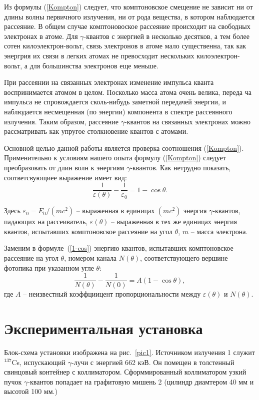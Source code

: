 \documentclass[a4paper,12pt]{article} %
\begin{document}
	Из формулы (\ref{Kompton}) следует, что комптоновское смещение не зависит ни от длины волны первичного излучения, ни от рода вещества, в котором наблюдается рассеяние. В общем случае комптоновоское рассеяние происходит на свободных электронах в атоме. Для $\gamma$-квантов с энергией в несколько десятков, а тем более сотен килоэлектрон-вольт, связь электронов в атоме мало существенна, так как энергрия их связи в легких атомах не превосходит нескольких килоэлектрон-вольт, а для большинства электронов еще меньше.
	
	При рассеянии на связанных электронах изменение импульса кванта воспринимается атомом в целом. Посколько масса атома очень велика, переда ча импульса не спровождается сколь-нибудь заметной передачей энергии, и наблюдается несмещенная (по энергии) компонента в спектре рассеянного излучения. Таким образом, рассеяние $\gamma$-квантов на связанных электронах можно рассматривать как упругое столкновение квантов с атомами.
	
	Основной целью данной работы является проверка соотношения (\ref{Kompton}). Применительно к условиям нашего опыта формулу (\ref{Kompton}) следует преобразовать от длин волн к энергиям $\gamma$-квантов. Как нетрудно показать, соответсвующиее выражение имеет вид:
	\begin{equation}
		\label{1-cos}
		\tag{$\star\star$}
		\frac{1}{\varepsilon(\theta)} - \frac{1}{\varepsilon_0} = 1 - \cos \theta.
	\end{equation}

	Здесь $\varepsilon_0 = E_0/(mc^2)$ -- выраженная в единицах $(mc^2)$ энергия $\gamma$-квантов, падающих на рассеиватель, $\varepsilon(\theta)$ -- выраженная в тех же единицах энергия квантов, испытавших комптоновское рассеяние на угол $\theta$, $m$ -- масса электрона.
	
	Заменим в формуле~(\ref{1-cos}) энергию квантов, испытавших комптоновское рассеяние на угол $\theta$, номером канала $N(\theta)$, соответствующего вершине фотопика при указанном угле $\theta$:
	\begin{equation}
		\label{kek}
		\tag{$\star \star \star$}
		\frac{1}{N(\theta)} - \frac{1}{N(0)} = A (1- \cos \theta),
	\end{equation}
	где $A$ -- неизвестный коэффциицент пропорциональности между $\varepsilon(\theta)$ и $N(\theta)$.
\newpage
\section{Экспериментальная установка}
	Блок-схема установки изображена на рис.~\ref{pic1}. Источником излучения 1 служит $^{137}$Cs, испускающий $\gamma$-лучи с энергией 662 кэВ. Он помещен в толстенный свинцовый контейнер с коллиматором. Сформмированный коллиматором узкий пучок $\gamma$-квантов попадает на графитовую мишень 2 (цилиндр диамтером 40 мм и высотой 100 мм.)
	
\end{document}
